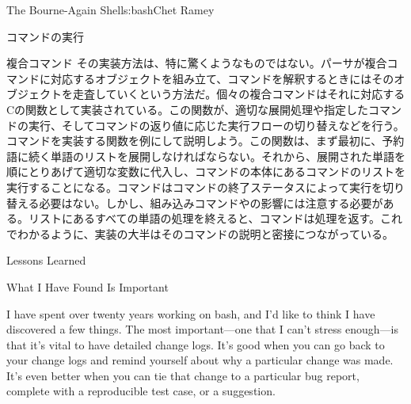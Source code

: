 \begin{aosachapter}{The Bourne-Again Shell}{s:bash}{Chet Ramey}
\begin{aosasect1}{コマンドの実行}
\begin{aosasect2}{複合コマンド}
その実装方法は、特に驚くようなものではない。パーサが複合コマンドに対応するオブジェクトを組み立て、コマンドを解釈するときにはそのオブジェクトを走査していくという方法だ。個々の複合コマンドはそれに対応するCの関数として実装されている。この関数が、適切な展開処理や指定したコマンドの実行、そしてコマンドの返り値に応じた実行フローの切り替えなどを行う。コマンドを実装する関数を例にして説明しよう。この関数は、まず最初に、予約語に続く単語のリストを展開しなければならない。それから、展開された単語を順にとりあげて適切な変数に代入し、コマンドの本体にあるコマンドのリストを実行することになる。コマンドはコマンドの終了ステータスによって実行を切り替える必要はない。しかし、組み込みコマンドやの影響には注意する必要がある。リストにあるすべての単語の処理を終えると、コマンドは処理を返す。これでわかるように、実装の大半はそのコマンドの説明と密接につながっている。

\end{aosasect2}

\end{aosasect1}

\begin{aosasect1}{Lessons Learned}

\begin{aosasect2}{What I Have Found Is Important}

I have spent over twenty years working on bash, and I'd like to think
I have discovered a few things.
The most important---one that I can't stress enough---is that it's
vital to have detailed change logs.  It's good when you can go back to
your change logs and remind yourself about why a particular change was
made. It's even better when you can tie that change to a particular
bug report, complete with a reproducible test case, or a suggestion.


\end{aosasect2}
\end{aosasect1}
\end{aosachapter}
